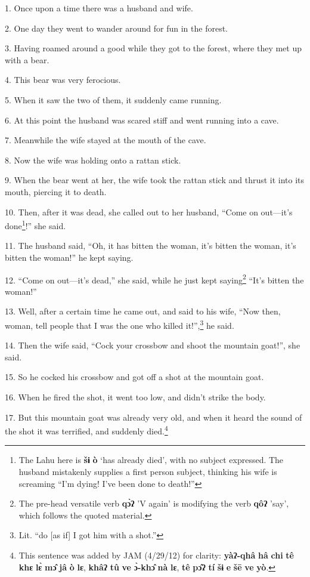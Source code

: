 \setcounter{footnote}{0}

1. Once upon a time there was a husband and wife.

2. One day they went to wander around for fun in the forest.

3. Having roamed around a good while they got to the forest, where they met up
with a bear.

4. This bear was very ferocious.

5. When it saw the two of them, it suddenly came running.

6. At this point the husband was scared stiff and went running into a cave.

7. Meanwhile the wife stayed at the mouth of the cave.

8. Now the wife was holding onto a rattan stick.

9. When the bear went at her, the wife took the rattan stick and thrust it into
its mouth, piercing it to death.

10. Then, after it was dead, she called out to her husband, ``Come on out---it's
done\footnote{The Lahu here is \textbf{šɨ} \textbf{ò} `has already died', with no subject expressed. The husband mistakenly supplies a first person subject, thinking his wife is screaming ``I'm dying! I've been done to death!''}!'' she said.

11. The husband said, ``Oh, it has bitten the woman, it's bitten the woman, it's
bitten the woman!'' he kept saying.

12. ``Come on out---it's dead,'' she said, while he just kept saying\footnote{The pre-head versatile verb \textbf{qɔ̀ʔ} 'V again' is modifying the verb \textbf{qôʔ} 'say', which follows the quoted material.} ``It's
bitten the woman!''

13. Well, after a certain time he came out, and said to his wife, ``Now then, woman,
tell people that I was the one who killed it!'',\footnote{Lit. ``do [as if] I got him with a shot.''} he said.

14. Then the wife said, ``Cock your crossbow and shoot the mountain goat!'', she
said.

15. So he cocked his crossbow and got off a shot at the mountain goat.

16. When he fired the shot, it went too low, and didn't strike the body.

17. But this mountain goat was already very old, and when it heard the sound of
the shot it was terrified, and suddenly died.\footnote{This sentence was added by JAM (4/29/12) for clarity: \textbf{yàʔ-qhâ} \textbf{hâ} \textbf{chi} \textbf{tê} \textbf{khɛ} \textbf{lɛ̀} \textbf{mɔ̂} \textbf{jâ} \textbf{ò} \textbf{lɛ}, \textbf{khâʔ} \textbf{tû} \textbf{ve} \textbf{ɔ̀-khɔ̂} \textbf{nà} \textbf{lɛ}, \textbf{tê} \textbf{pɔ̂ʔ} \textbf{tí} \textbf{šɨ} \textbf{e} \textbf{šē} \textbf{ve} \textbf{yò}.}

